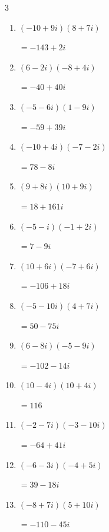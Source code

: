 \begin{multicols}{3}
\begin{enumerate}
  \item $\displaystyle (-10+9i)(8+7i)$

        $\displaystyle =-143+2i$

  \item $\displaystyle (6-2i)(-8+4i)$

        $\displaystyle =-40+40i$

  \item $\displaystyle (-5-6i)(1-9i)$

        $\displaystyle =-59+39i$

  \item $\displaystyle (-10+4i)(-7-2i)$

        $\displaystyle =78-8i$

  \item $\displaystyle (9+8i)(10+9i)$

        $\displaystyle =18+161i$

  \item $\displaystyle (-5-i)(-1+2i)$

        $\displaystyle =7-9i$

  \item $\displaystyle (10+6i)(-7+6i)$

        $\displaystyle =-106+18i$

\columnbreak %

\resetques

  \item $\displaystyle (-5-10i)(4+7i)$

        $\displaystyle =50-75i$

  \item $\displaystyle (6-8i)(-5-9i)$

        $\displaystyle =-102-14i$

  \item $\displaystyle (10-4i)(10+4i)$

        $\displaystyle =116$

  \item $\displaystyle (-2-7i)(-3-10i)$

        $\displaystyle =-64+41i$

  \item $\displaystyle (-6-3i)(-4+5i)$

        $\displaystyle =39-18i$

  \item $\displaystyle (-8+7i)(5+10i)$

        $\displaystyle =-110-45i$


\end{enumerate}
\end{multicols}
